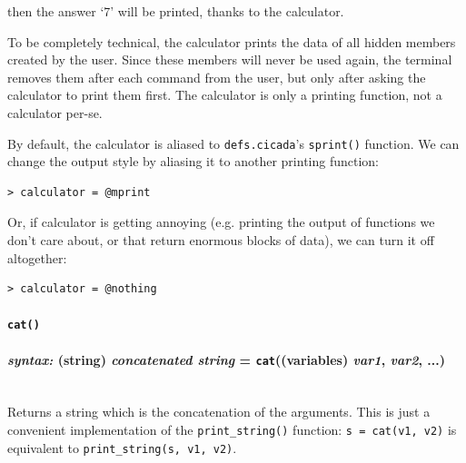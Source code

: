 \documentclass{article}
\newenvironment{code}{
       \begin{list}{}{
               \setlength{\leftmargin}{.4in}
               \setlength{\rightmargin}{0in}
               \setlength{\topsep}{.2in}
       }
       \small
       \item[] }
       { \end{list}   }
\begin{document}
\noindent then the answer `7' will be printed, thanks to the calculator.

To be completely technical, the calculator prints the data of all hidden members created by the user.  Since these members will never be used again, the terminal removes them after each command from the user, but only after asking the calculator to print them first.  The calculator is only a printing function, not a calculator per-se.

By default, the calculator is aliased to \verb#defs.cicada#'s \verb#sprint()# function.  We can change the output style by aliasing it to another printing function:

\begin{code} \begin{verbatim}
> calculator = @mprint
\end{verbatim} \end{code}

\noindent Or, if calculator is getting annoying (e.g. printing the output of functions we don't care about, or that return enormous blocks of data), we can turn it off altogether:

\begin{code} \begin{verbatim}
> calculator = @nothing
\end{verbatim} \end{code}





\paragraph{\texttt{cat()}\\\\
\normalfont \emph{syntax: } (string) \emph{concatenated string} = \texttt{cat}((variables) \emph{var1}, \emph{var2}, ...)\\\\}

Returns a string which is the concatenation of the arguments.  This is just a convenient implementation of the \verb#print_string()# function:  \verb#s = cat(v1, v2)# is equivalent to \verb#print_string(s, v1, v2)#.\\\\\\\\
\end{document}
